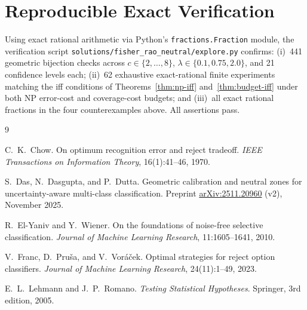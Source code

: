 \documentclass[11pt]{article}
\theoremstyle{plain}
\theoremstyle{definition}
\theoremstyle{remark}
\begin{document}
\section{Reproducible Exact Verification}

Using exact rational arithmetic via Python's \texttt{fractions.Fraction} module, the verification script \texttt{solutions/fisher\_rao\_neutral/explore.py} confirms: (i)~441 geometric bijection checks across $c \in \{2, \dots, 8\}$, $\lambda \in \{0.1, 0.75, 2.0\}$, and 21 confidence levels each; (ii)~62 exhaustive exact-rational finite experiments matching the iff conditions of Theorems~\ref{thm:np-iff} and~\ref{thm:budget-iff} under both NP error-cost and coverage-cost budgets; and (iii)~all exact rational fractions in the four counterexamples above. All assertions pass.

\begin{thebibliography}{9}

C.~K.~Chow.
On optimum recognition error and reject tradeoff.
\emph{IEEE Transactions on Information Theory}, 16(1):41--46, 1970.

S.~Das, N.~Dasgupta, and P.~Dutta.
Geometric calibration and neutral zones for uncertainty-aware multi-class classification.
Preprint \href{https://arxiv.org/abs/2511.20960}{arXiv:2511.20960} (v2), November 2025.

R.~El-Yaniv and Y.~Wiener.
On the foundations of noise-free selective classification.
\emph{Journal of Machine Learning Research}, 11:1605--1641, 2010.

V.~Franc, D.~Pru\v{s}a, and V.~Vor\'a\v{c}ek.
Optimal strategies for reject option classifiers.
\emph{Journal of Machine Learning Research}, 24(11):1--49, 2023.

E.~L.~Lehmann and J.~P.~Romano.
\emph{Testing Statistical Hypotheses}.
Springer, 3rd edition, 2005.

\end{thebibliography}
\end{document}
